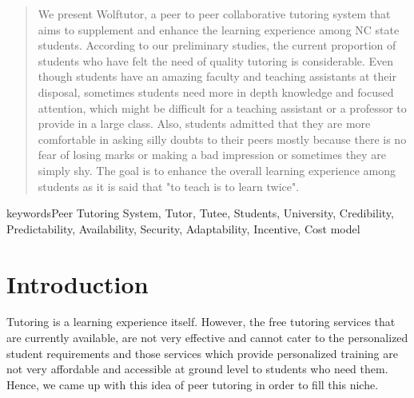 \documentclass{sig-alternate-05-2015}
\begin{document}
\maketitle
\begin{abstract}
We present Wolftutor, a peer to peer collaborative tutoring system that aims to supplement and enhance the learning experience among NC state students. According to our preliminary studies, the current proportion of students who have felt the need of quality tutoring  is considerable. Even though students have an amazing faculty and teaching assistants at their disposal, sometimes students need more in depth knowledge and focused attention, which might be difficult for a teaching assistant or a professor to provide in a large class. Also, students admitted that they are  more comfortable in asking silly doubts to their peers mostly because there is no fear of losing marks or making a bad impression or sometimes they are simply shy. The goal is to enhance the overall learning experience among students as it is said that "to teach is to learn twice". 

\end{abstract}



%
%
\printccsdesc


keywords{Peer Tutoring System, Tutor, Tutee, Students, University, Credibility, Predictability, Availability, Security, Adaptability, Incentive, Cost model}

\section{Introduction}
Tutoring is a learning experience itself. However, the free tutoring services that are currently available, are not very effective and cannot cater to the personalized student requirements and those services which provide personalized training are not very affordable and accessible at ground level to students who need them. Hence, we came up with this idea of peer tutoring in order to fill this niche\cite{Kim:PeerTutoring}. 
\end{document}
